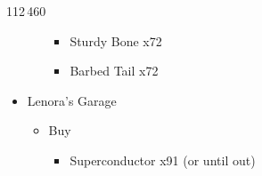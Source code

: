 \begin{shop}{112\,460}
\begin{multicols}{2}
\begin{itemize}
\begin{itemize}
                    \begin{itemize}
                      \item Sturdy Bone x72
                      \item Barbed Tail x72
                    \end{itemize}
            \end{itemize}
      \item Lenora's Garage
            \begin{itemize}
              \item Buy
                    \begin{itemize}
                      \item Superconductor x91 (or until out)
                    \end{itemize}
            \end{itemize}
    \end{itemize}
  \end{multicols}
\end{shop}

